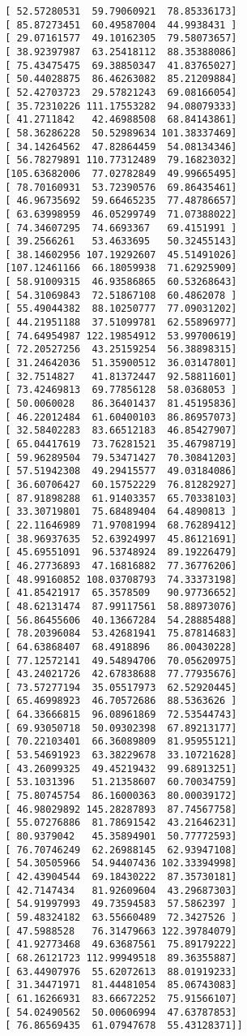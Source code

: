 \documentclass{article}
\begin{document}
\begin{lstlisting}
 [ 52.57280531  59.79060921  78.85336173]
 [ 85.87273451  60.49587004  44.9938431 ]
 [ 29.07161577  49.10162305  79.58073657]
 [ 38.92397987  63.25418112  88.35388086]
 [ 75.43475475  69.38850347  41.83765027]
 [ 50.44028875  86.46263082  85.21209884]
 [ 52.42703723  29.57821243  69.08166054]
 [ 35.72310226 111.17553282  94.08079333]
 [ 41.2711842   42.46988508  68.84143861]
 [ 58.36286228  50.52989634 101.38337469]
 [ 34.14264562  47.82864459  54.08134346]
 [ 56.78279891 110.77312489  79.16823032]
 [105.63682006  77.02782849  49.99665495]
 [ 78.70160931  53.72390576  69.86435461]
 [ 46.96735692  59.66465235  77.48786657]
 [ 63.63998959  46.05299749  71.07388022]
 [ 74.34607295  74.6693367   69.4151991 ]
 [ 39.2566261   53.4633695   50.32455143]
 [ 38.14602956 107.19292607  45.51491026]
 [107.12461166  66.18059938  71.62925909]
 [ 58.91009315  46.93586865  60.53268643]
 [ 54.31069843  72.51867108  60.4862078 ]
 [ 55.49044382  88.10250777  77.09031202]
 [ 44.21951188  37.51099781  62.55896977]
 [ 74.64954987 122.19854912  53.99700619]
 [ 72.20527256  43.25159254  56.38898315]
 [ 31.24642036  51.35900512  36.03147801]
 [ 32.7514827   41.81372447  92.58811601]
 [ 73.42469813  69.77856128  58.0368053 ]
 [ 50.0060028   86.36401437  81.45195836]
 [ 46.22012484  61.60400103  86.86957073]
 [ 32.58402283  83.66512183  46.85427907]
 [ 65.04417619  73.76281521  35.46798719]
 [ 59.96289504  79.53471427  70.30841203]
 [ 57.51942308  49.29415577  49.03184086]
 [ 36.60706427  60.15752229  76.81282927]
 [ 87.91898288  61.91403357  65.70338103]
 [ 33.30719801  75.68489404  64.4890813 ]
 [ 22.11646989  71.97081994  68.76289412]
 [ 38.96937635  52.63924997  45.86121691]
 [ 45.69551091  96.53748924  89.19226479]
 [ 46.27736893  47.16816882  77.36776206]
 [ 48.99160852 108.03708793  74.33373198]
 [ 41.85421917  65.3578509   90.97736652]
 [ 48.62131474  87.99117561  58.88973076]
 [ 56.86455606  40.13667284  54.28885488]
 [ 78.20396084  53.42681941  75.87814683]
 [ 64.63868407  68.4918896   86.00430228]
 [ 77.12572141  49.54894706  70.05620975]
 [ 43.24021726  42.67838688  77.77935676]
 [ 73.57277194  35.05517973  62.52920445]
 [ 65.46998923  46.70572686  88.5363626 ]
 [ 64.33666815  96.08961869  72.53544743]
 [ 69.93050718  50.09302398  67.89213177]
 [ 70.22103401  66.36089809  81.95955121]
 [ 53.54691923  63.38229678  33.10721628]
 [ 43.26099325  49.45219432  99.68913251]
 [ 53.1031396   51.21358607  60.70034759]
 [ 75.80745754  86.16000363  80.00039172]
 [ 46.98029892 145.28287893  87.74567758]
 [ 55.07276886  81.78691542  43.21646231]
 [ 80.9379042   45.35894901  50.77772593]
 [ 76.70746249  62.26988145  62.93947108]
 [ 54.30505966  54.94407436 102.33394998]
 [ 42.43904544  69.18430222  87.35730181]
 [ 42.7147434   81.92609604  43.29687303]
 [ 54.91997993  49.73594583  57.5862397 ]
 [ 59.48324182  63.55660489  72.3427526 ]
 [ 47.5988528   76.31479663 122.39784079]
 [ 41.92773468  49.63687561  75.89179222]
 [ 68.26121723 112.99949518  89.36355887]
 [ 63.44907976  55.62072613  88.01919233]
 [ 31.34471971  81.44481054  85.06743083]
 [ 61.16266931  83.66672252  75.91566107]
 [ 54.02490562  50.00606994  47.63787853]
 [ 76.86569435  61.07947678  55.43128371]]


\end{lstlisting}
\end{document}
